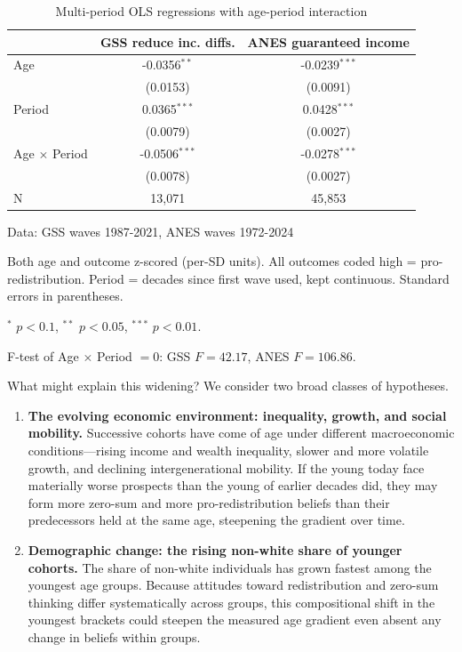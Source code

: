 \documentclass[11pt, headsepline]{article}
\begin{document}
\begin{table}[H]
\caption{Multi-period OLS regressions with age-period interaction}
\label{table:multi-period-regression}
\centering
\begin{threeparttable}
\begin{tabular}{lcc}
\toprule
 & GSS reduce inc. diffs. & ANES guaranteed income \\
\midrule
Age & -0.0356$^{**}$ & -0.0239$^{***}$ \\
    & (0.0153) & (0.0091) \\
Period & 0.0365$^{***}$ & 0.0428$^{***}$ \\
       & (0.0079) & (0.0027) \\
Age $\times$ Period & -0.0506$^{***}$ & -0.0278$^{***}$ \\
                    & (0.0078) & (0.0027) \\
\midrule
N & 13,071 & 45,853 \\
\bottomrule
\end{tabular}
\begin{tablenotes}[flushleft]
\footnotesize
\item Data: GSS waves 1987-2021, ANES waves 1972-2024
\item Both age and outcome z-scored (per-SD units). All outcomes coded high =
pro-redistribution. Period = decades since first wave used, kept continuous.
Standard errors in parentheses.
\item $^{*}$ $p<0.1$, $^{**}$ $p<0.05$, $^{***}$ $p<0.01$.
\item F-test of Age $\times$ Period $=0$: GSS $F=42.17$, ANES $F=106.86$.
\end{tablenotes}
\end{threeparttable}
\end{table}

What might explain this widening? We consider two broad classes of hypotheses.

\begin{enumerate}[label=(\roman*), leftmargin=*]
\item \textbf{The evolving economic environment: inequality, growth, and social mobility.} Successive cohorts have come of age under different macroeconomic conditions---rising income and wealth inequality, slower and more volatile growth, and declining intergenerational mobility. If the young today face materially worse prospects than the young of earlier decades did, they may form more zero-sum and more pro-redistribution beliefs than their predecessors held at the same age, steepening the gradient over time.
\item \textbf{Demographic change: the rising non-white share of younger cohorts.} The share of non-white individuals has grown fastest among the youngest age groups. Because attitudes toward redistribution and zero-sum thinking differ systematically across groups, this compositional shift in the youngest brackets could steepen the measured age gradient even absent any change in beliefs within groups.
\end{enumerate}
\end{document}
